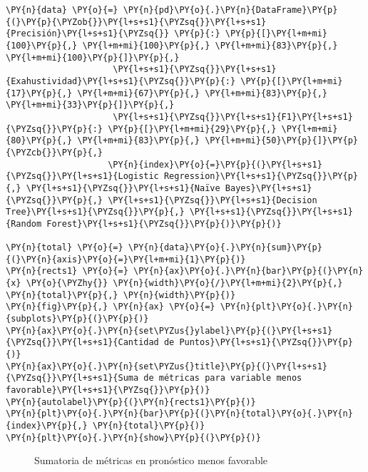 	\begin{tcolorbox}[breakable, size=fbox, boxrule=1pt, pad at break*=1mm,colback=cellbackground, colframe=cellborder]
\begin{Verbatim}[commandchars=\\\{\}]
\PY{n}{data} \PY{o}{=} \PY{n}{pd}\PY{o}{.}\PY{n}{DataFrame}\PY{p}{(}\PY{p}{\PYZob{}}\PY{l+s+s1}{\PYZsq{}}\PY{l+s+s1}{Precisión}\PY{l+s+s1}{\PYZsq{}} \PY{p}{:} \PY{p}{[}\PY{l+m+mi}{100}\PY{p}{,} \PY{l+m+mi}{100}\PY{p}{,} \PY{l+m+mi}{83}\PY{p}{,} \PY{l+m+mi}{100}\PY{p}{]}\PY{p}{,}
                     \PY{l+s+s1}{\PYZsq{}}\PY{l+s+s1}{Exahustividad}\PY{l+s+s1}{\PYZsq{}}\PY{p}{:} \PY{p}{[}\PY{l+m+mi}{17}\PY{p}{,} \PY{l+m+mi}{67}\PY{p}{,} \PY{l+m+mi}{83}\PY{p}{,} \PY{l+m+mi}{33}\PY{p}{]}\PY{p}{,}
                     \PY{l+s+s1}{\PYZsq{}}\PY{l+s+s1}{F1}\PY{l+s+s1}{\PYZsq{}}\PY{p}{:} \PY{p}{[}\PY{l+m+mi}{29}\PY{p}{,} \PY{l+m+mi}{80}\PY{p}{,} \PY{l+m+mi}{83}\PY{p}{,} \PY{l+m+mi}{50}\PY{p}{]}\PY{p}{\PYZcb{}}\PY{p}{,}
                    \PY{n}{index}\PY{o}{=}\PY{p}{(}\PY{l+s+s1}{\PYZsq{}}\PY{l+s+s1}{Logistic Regression}\PY{l+s+s1}{\PYZsq{}}\PY{p}{,} \PY{l+s+s1}{\PYZsq{}}\PY{l+s+s1}{Naïve Bayes}\PY{l+s+s1}{\PYZsq{}}\PY{p}{,} \PY{l+s+s1}{\PYZsq{}}\PY{l+s+s1}{Decision Tree}\PY{l+s+s1}{\PYZsq{}}\PY{p}{,} \PY{l+s+s1}{\PYZsq{}}\PY{l+s+s1}{Random Forest}\PY{l+s+s1}{\PYZsq{}}\PY{p}{)}\PY{p}{)}

\PY{n}{total} \PY{o}{=} \PY{n}{data}\PY{o}{.}\PY{n}{sum}\PY{p}{(}\PY{n}{axis}\PY{o}{=}\PY{l+m+mi}{1}\PY{p}{)}
\PY{n}{rects1} \PY{o}{=} \PY{n}{ax}\PY{o}{.}\PY{n}{bar}\PY{p}{(}\PY{n}{x} \PY{o}{\PYZhy{}} \PY{n}{width}\PY{o}{/}\PY{l+m+mi}{2}\PY{p}{,} \PY{n}{total}\PY{p}{,} \PY{n}{width}\PY{p}{)}
\PY{n}{fig}\PY{p}{,} \PY{n}{ax} \PY{o}{=} \PY{n}{plt}\PY{o}{.}\PY{n}{subplots}\PY{p}{(}\PY{p}{)}
\PY{n}{ax}\PY{o}{.}\PY{n}{set\PYZus{}ylabel}\PY{p}{(}\PY{l+s+s1}{\PYZsq{}}\PY{l+s+s1}{Cantidad de Puntos}\PY{l+s+s1}{\PYZsq{}}\PY{p}{)}
\PY{n}{ax}\PY{o}{.}\PY{n}{set\PYZus{}title}\PY{p}{(}\PY{l+s+s1}{\PYZsq{}}\PY{l+s+s1}{Suma de métricas para variable menos favorable}\PY{l+s+s1}{\PYZsq{}}\PY{p}{)}
\PY{n}{autolabel}\PY{p}{(}\PY{n}{rects1}\PY{p}{)}
\PY{n}{plt}\PY{o}{.}\PY{n}{bar}\PY{p}{(}\PY{n}{total}\PY{o}{.}\PY{n}{index}\PY{p}{,} \PY{n}{total}\PY{p}{)}
\PY{n}{plt}\PY{o}{.}\PY{n}{show}\PY{p}{(}\PY{p}{)}
\end{Verbatim}
\end{tcolorbox}

\begin{center}
    	\begin{figure}[H]
	\centering
	\caption{Sumatoria de métricas en pronóstico menos favorable}
	\label{fig:smpmf}
	\end{figure}
\end{center}
    
